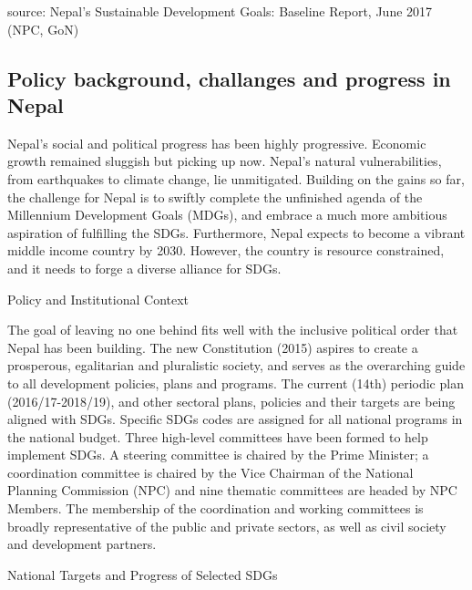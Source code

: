 \documentclass[
  openany]{book}
\begin{document}
source: Nepal's Sustainable Development Goals: Baseline Report, June 2017 (NPC, GoN)

\hypertarget{policy-background-challanges-and-progress-in-nepal}{%
\subsection{Policy background, challanges and progress in Nepal}\label{policy-background-challanges-and-progress-in-nepal}}

Nepal's social and political progress has been highly progressive. Economic growth remained sluggish but picking up now. Nepal's natural vulnerabilities, from earthquakes to climate change, lie unmitigated. Building on the gains so far, the challenge for Nepal is to swiftly complete the unfinished agenda of the Millennium Development Goals (MDGs), and embrace a much more ambitious aspiration of fulfilling the SDGs. Furthermore, Nepal expects to become a vibrant middle income country by 2030. However, the country is resource constrained, and it needs to forge a diverse alliance for SDGs.

Policy and Institutional Context

The goal of leaving no one behind fits well with the inclusive political order that Nepal has been building. The new Constitution (2015) aspires to create a prosperous, egalitarian and pluralistic society, and serves as the overarching guide to all development policies, plans and programs. The current (14th) periodic plan (2016/17-2018/19), and other sectoral plans, policies and their targets are being aligned with SDGs. Specific SDGs codes are assigned for all national programs in the national budget. Three high-level committees have been formed to help implement SDGs. A steering committee is chaired by the Prime Minister; a coordination committee is chaired by the Vice Chairman of the National Planning Commission (NPC) and nine thematic committees are headed by NPC Members. The membership of the coordination and working committees is broadly representative of the public and private sectors, as well as civil society and development partners.

National Targets and Progress of Selected SDGs
\end{document}
